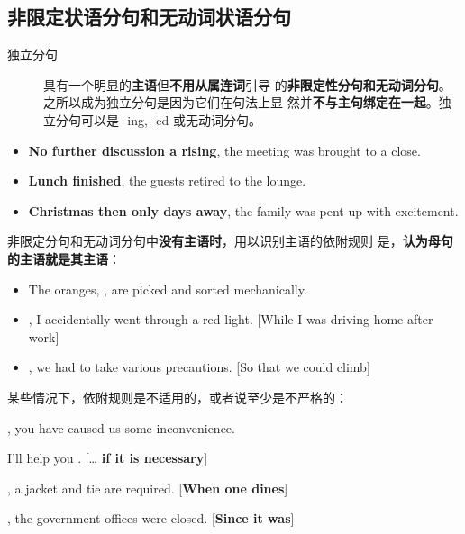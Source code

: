 
\subsection{非限定状语分句和无动词状语分句}

\begin{description}
\item[独立分句] 具有一个明显的\textbf{主语}但\textbf{不用从属连词}引导
  的\textbf{非限定性分句和无动词分句}。之所以成为独立分句是因为它们在句法上显
  然并\textbf{不与主句绑定在一起}。独立分句可以是 -ing, -ed 或无动词分句。
\end{description}

\begin{itemize}
\item \textbf{No further discussion a rising}, the meeting was brought to a close.
\item \textbf{Lunch finished}, the guests retired to the lounge.
\item \textbf{Christmas then only days away}, the family was pent up with excitement.
\end{itemize}

非限定分句和无动词分句中\textbf{没有主语时}，用以识别主语的依附规则
是，\textbf{认为母句的主语就是其主语}：
\begin{itemize}
\item The oranges, , are picked and sorted
  mechanically.

\item {}, I accidentally went through a red
  light. [While I was driving home after work]

\item {}, we had to take various precautions. [So that
  we could climb]

\end{itemize}

某些情况下，依附规则是不适用的，或者说至少是不严格的：
\begin{description}[style=nextline]
\item[分句是一个主语外接状语, 这时隐含的主语是说话者 I]

  , you have caused us some inconvenience.

\item[隐含的主语是整个主句]

  I'll help you . [\ldots{} \textbf{if it is necessary}]

\item[隐含的主语是一个不定代词或支撑词 it]

  , a jacket and tie are required. [\textbf{When one
  dines}]

  , the government offices were closed. [\textbf{Since it was}]
\end{description}

